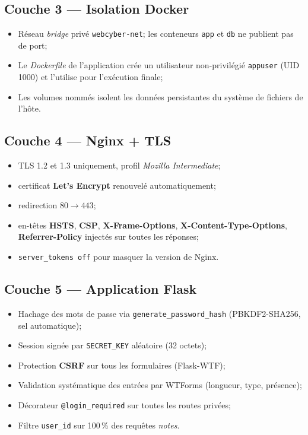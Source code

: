 \subsection{Couche 3 --- Isolation Docker}

\begin{itemize}
  \item Réseau \emph{bridge} privé \texttt{webcyber-net}; les
        conteneurs \texttt{app} et \texttt{db} ne publient pas de
        port;
  \item Le \emph{Dockerfile} de l'application crée un utilisateur
        non-privilégié \texttt{appuser} (UID 1000) et l'utilise pour
        l'exécution finale;
  \item Les volumes nommés isolent les données persistantes du système
        de fichiers de l'hôte.
\end{itemize}

\subsection{Couche 4 --- Nginx + TLS}

\begin{itemize}
  \item TLS 1.2 et 1.3 uniquement, profil \emph{Mozilla Intermediate};
  \item certificat \textbf{Let's Encrypt} renouvelé automatiquement;
  \item redirection \(80 \to 443\);
  \item en-têtes \textbf{HSTS}, \textbf{CSP}, \textbf{X-Frame-Options},
        \textbf{X-Content-Type-Options}, \textbf{Referrer-Policy}
        injectés sur toutes les réponses;
  \item \texttt{server\_tokens off} pour masquer la version de Nginx.
\end{itemize}

\subsection{Couche 5 --- Application Flask}

\begin{itemize}
  \item Hachage des mots de passe via
        \texttt{generate\_password\_hash} (PBKDF2-SHA256, sel
        automatique);
  \item Session signée par \texttt{SECRET\_KEY} aléatoire (32 octets);
  \item Protection \textbf{CSRF} sur tous les formulaires (Flask-WTF);
  \item Validation systématique des entrées par WTForms (longueur,
        type, présence);
  \item Décorateur \texttt{@login\_required} sur toutes les routes
        privées;
  \item Filtre \texttt{user\_id} sur 100\,\% des requêtes \emph{notes}.
\end{itemize}

